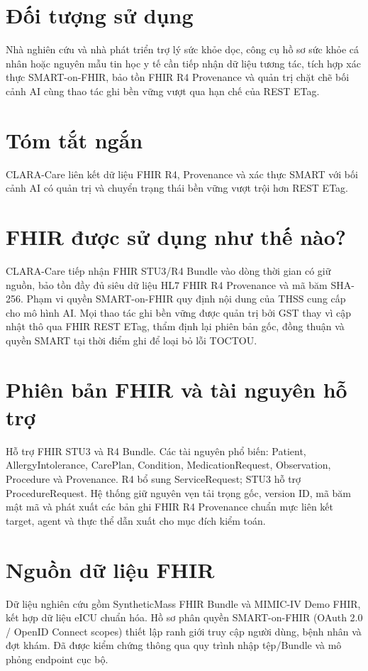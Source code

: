 \documentclass[10pt]{article}
\begin{document}
\section{Đối tượng sử dụng}
Nhà nghiên cứu và nhà phát triển trợ lý sức khỏe dọc, công cụ hồ sơ sức khỏe cá nhân hoặc nguyên mẫu tin học y tế cần tiếp nhận dữ liệu tương tác, tích hợp xác thực SMART-on-FHIR, bảo tồn FHIR R4 Provenance và quản trị chặt chẽ bối cảnh AI cùng thao tác ghi bền vững vượt qua hạn chế của REST ETag.

\section{Tóm tắt ngắn}
CLARA-Care liên kết dữ liệu FHIR R4, Provenance và xác thực SMART với bối cảnh AI có quản trị và chuyển trạng thái bền vững vượt trội hơn REST ETag.

\section{FHIR được sử dụng như thế nào?}
CLARA-Care tiếp nhận FHIR STU3/R4 Bundle vào dòng thời gian có giữ nguồn, bảo tồn đầy đủ siêu dữ liệu HL7 FHIR R4 Provenance và mã băm SHA-256. Phạm vi quyền SMART-on-FHIR quy định nội dung của THSS cung cấp cho mô hình AI. Mọi thao tác ghi bền vững được quản trị bởi GST thay vì cập nhật thô qua FHIR REST ETag, thẩm định lại phiên bản gốc, đồng thuận và quyền SMART tại thời điểm ghi để loại bỏ lỗi TOCTOU.

\section{Phiên bản FHIR và tài nguyên hỗ trợ}
Hỗ trợ FHIR STU3 và R4 Bundle. Các tài nguyên phổ biến: Patient, AllergyIntolerance, CarePlan, Condition, MedicationRequest, Observation, Procedure và Provenance. R4 bổ sung ServiceRequest; STU3 hỗ trợ ProcedureRequest. Hệ thống giữ nguyên vẹn tải trọng gốc, version ID, mã băm mật mã và phát xuất các bản ghi FHIR R4 Provenance chuẩn mực liên kết target, agent và thực thể dẫn xuất cho mục đích kiểm toán.

\section{Nguồn dữ liệu FHIR}
Dữ liệu nghiên cứu gồm SyntheticMass FHIR Bundle và MIMIC-IV Demo FHIR, kết hợp dữ liệu eICU chuẩn hóa. Hồ sơ phân quyền SMART-on-FHIR (OAuth 2.0 / OpenID Connect scopes) thiết lập ranh giới truy cập người dùng, bệnh nhân và đợt khám. Đã được kiểm chứng thông qua quy trình nhập tệp/Bundle và mô phỏng endpoint cục bộ.
\end{document}
